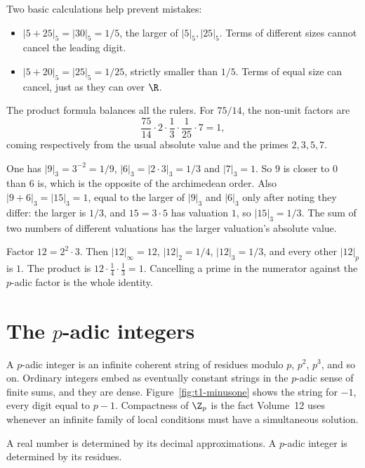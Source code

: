 Two basic calculations help prevent mistakes:
\begin{itemize}
\item $|5+25|_5=|30|_5=1/5$, the larger of $|5|_5,|25|_5$.
Terms of different sizes cannot cancel the leading digit.
\item $|5+20|_5=|25|_5=1/25$, strictly smaller than $1/5$.
Terms of equal size can cancel, just as they can over $\R$.
\end{itemize}
The product formula balances all the rulers. For $75/14$, the non-unit
factors are
\[
\frac{75}{14}\cdot2\cdot\frac13\cdot\frac1{25}\cdot7=1,
\]
coming respectively from the usual absolute value and the primes $2,3,5,7$.

\begin{examplex}
One has $|9|_3=3^{-2}=1/9$, $|6|_3=|2\cdot 3|_3=1/3$ and $|7|_3=1$. So $9$ is closer to $0$ than $6$ is, which is the opposite of the archimedean order. Also $|9+6|_3=|15|_3=1$, equal to the larger of $|9|_3$ and $|6|_3$ only after noting they differ: the larger is $1/3$, and $15=3\cdot 5$ has valuation $1$, so $|15|_3=1/3$. The sum of two numbers of different valuations has the larger valuation's absolute value.
\end{examplex}

\begin{examplex}
Factor $12=2^2\cdot 3$. Then $|12|_\infty=12$, $|12|_2=1/4$, $|12|_3=1/3$, and every other $|12|_p$ is $1$. The product is $12\cdot\frac14\cdot\frac13=1$. Cancelling a prime in the numerator against the $p$-adic factor is the whole identity.
\end{examplex}

\section{The \texorpdfstring{$p$}{p}-adic integers}

A $p$-adic integer is an infinite coherent string of residues modulo $p$, $p^2$, $p^3$, and so on. Ordinary integers embed as eventually constant strings in the $p$-adic sense of finite sums, and they are dense. Figure~\ref{fig:t1-minusone} shows the string for $-1$, every digit equal to $p-1$. Compactness of $\Z_p$ is the fact Volume~12 uses whenever an infinite family of local conditions must have a simultaneous solution.

A real number is determined by its decimal approximations. A $p$-adic integer is determined by its residues.

